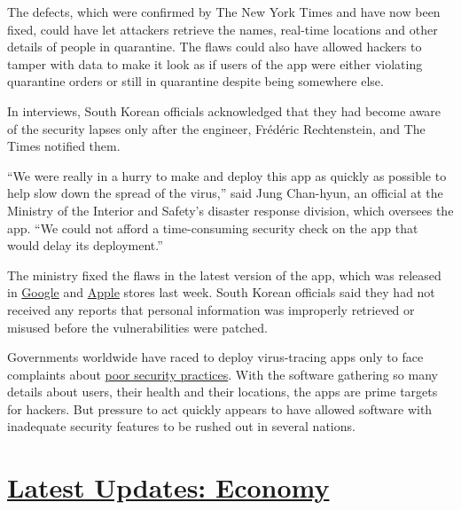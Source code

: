The defects, which were confirmed by The New York Times and have now
been fixed, could have let attackers retrieve the names, real-time
locations and other details of people in quarantine. The flaws could
also have allowed hackers to tamper with data to make it look as if
users of the app were either violating quarantine orders or still in
quarantine despite being somewhere else.

In interviews, South Korean officials acknowledged that they had become
aware of the security lapses only after the engineer, Frédéric
Rechtenstein, and The Times notified them.

``We were really in a hurry to make and deploy this app as quickly as
possible to help slow down the spread of the virus,'' said Jung
Chan-hyun, an official at the Ministry of the Interior and Safety's
disaster response division, which oversees the app. ``We could not
afford a time-consuming security check on the app that would delay its
deployment.''

The ministry fixed the flaws in the latest version of the app, which was
released in
\href{https://play.google.com/store/apps/details?id=kr.go.safekorea.sqsm\&hl=ko}{Google}
and
\href{https://apps.apple.com/us/app/\%EC\%9E\%90\%EA\%B0\%80\%EA\%B2\%A9\%EB\%A6\%AC\%EC\%9E\%90-\%EC\%95\%88\%EC\%A0\%84\%EB\%B3\%B4\%ED\%98\%B8/id1502372537}{Apple}
stores last week. South Korean officials said they had not received any
reports that personal information was improperly retrieved or misused
before the vulnerabilities were patched.

Governments worldwide have raced to deploy virus-tracing apps only to
face complaints about
\href{https://www.nytimes.com/2020/07/08/technology/virus-tracing-apps-privacy.html}{poor
security practices}. With the software gathering so many details about
users, their health and their locations, the apps are prime targets for
hackers. But pressure to act quickly appears to have allowed software
with inadequate security features to be rushed out in several nations.

\hypertarget{latest-updates-economy}{%
\section{\texorpdfstring{\href{https://www.nytimes.com/live/2020/07/31/business/stock-market-today-coronavirus?action=click\&pgtype=Article\&state=default\&region=MAIN_CONTENT_1\&context=storylines_live_updates}{Latest
Updates:
Economy}}{Latest Updates: Economy}}\label{latest-updates-economy}}


